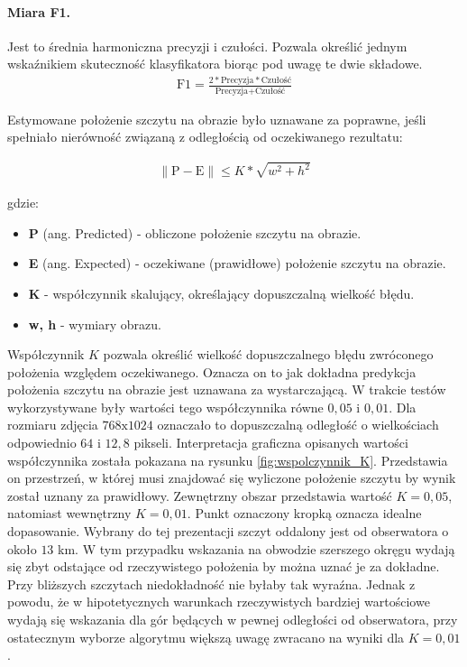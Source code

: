 \paragraph{Miara F1.} Jest to średnia harmoniczna precyzji i czułości. Pozwala określić jednym wskaźnikiem skuteczność klasyfikatora biorąc pod uwagę te dwie składowe. 
\begin{align*}
\textrm{F1} =  \frac{2*\textrm{Precyzja}*\textrm{Czułość}}{\textrm{Precyzja}+\textrm{Czułość}}
\end{align*} 


Estymowane położenie szczytu na obrazie było uznawane za poprawne, jeśli spełniało nierówność związaną z odległością od oczekiwanego rezultatu:

\begin{align*}
    \lVert \text{P} - \text{E} \rVert \le K*\sqrt{w^2 + h^2}
\end{align*}

gdzie: 
 
\begin{itemize}
    \item \textbf{P} (ang. Predicted) - obliczone położenie szczytu na obrazie.
    \item \textbf{E} (ang. Expected) - oczekiwane (prawidłowe) położenie szczytu na obrazie.
    \item \textbf{K} - współczynnik skalujący, określający dopuszczalną wielkość błędu.
    \item \textbf{w, h} - wymiary obrazu.
\end{itemize}


Współczynnik $K$ pozwala określić wielkość dopuszczalnego błędu zwróconego położenia względem oczekiwanego. Oznacza on to jak dokładna predykcja położenia szczytu na obrazie jest uznawana za wystarczającą. W trakcie testów wykorzystywane były wartości tego współczynnika równe $0,05$ i $0,01$. Dla rozmiaru zdjęcia $768\textrm{x}1024$ oznaczało to dopuszczalną odległość o wielkościach odpowiednio $64$ i $12,8$ pikseli. Interpretacja graficzna opisanych wartości współczynnika została pokazana na rysunku \ref{fig:wspolczynnik_K}. Przedstawia on przestrzeń, w której musi znajdować się wyliczone położenie szczytu by wynik został uznany za prawidłowy. Zewnętrzny obszar przedstawia wartość $K=0,05$, natomiast wewnętrzny $K=0,01$. Punkt oznaczony kropką oznacza idealne dopasowanie. Wybrany do tej prezentacji szczyt oddalony jest od obserwatora o około $13$ km. W tym przypadku wskazania na obwodzie szerszego okręgu wydają się zbyt odstające od rzeczywistego położenia by można uznać je za dokładne. Przy bliższych szczytach niedokładność nie byłaby tak wyraźna. Jednak z powodu, że w hipotetycznych warunkach rzeczywistych bardziej wartościowe wydają się wskazania dla gór będących w pewnej odległości od obserwatora, przy ostatecznym wyborze algorytmu większą uwagę zwracano na wyniki dla $K=0,01$.

